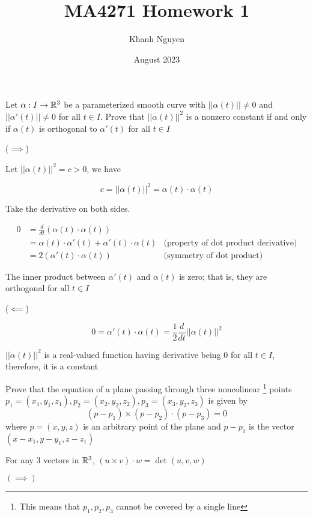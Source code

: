 \documentclass{article}
\title{
    MA4271 Homework 1
}
\author{Khanh Nguyen}
\date{August 2023}
\begin{document}
\maketitle

\begin{problem}
    Let $\alpha: I \to \mathbb{R}^3$ be a parameterized smooth curve with $||\alpha(t)|| \neq 0$ and $||\alpha'(t)|| \neq 0$ for all $t \in I$. Prove that $||\alpha(t)||^2$ is a nonzero constant if and only if $\alpha(t)$ is orthogonal to $\alpha'(t)$ for all $t \in I$
\end{problem}

($\implies$) 

Let $||\alpha(t)||^2 = c > 0$, we have

$$
    c = ||\alpha(t)||^2 = \alpha(t) \cdot \alpha(t)
$$

Take the derivative on both sides.

\begin{align*}
    0   &= \frac{d}{dt} ( \alpha(t) \cdot \alpha(t) )\\
        &= \alpha(t) \cdot \alpha'(t) + \alpha'(t) \cdot \alpha(t) &\text{(property of dot product derivative)}\\
        &= 2 (\alpha'(t) \cdot \alpha(t)) &\text{(symmetry of dot product)}
\end{align*}


The inner product between $\alpha'(t)$ and $\alpha(t)$ is zero; that is, they are orthogonal for all $t \in I$

($\impliedby$)

$$
    0 = \alpha'(t) \cdot \alpha(t) = \frac{1}{2} \frac{d}{dt} ||\alpha(t)||^2
$$

$||\alpha(t)||^2$ is a real-valued function having derivative being $0$ for all $t \in I$, therefore, it is a constant


\begin{problem}
    Prove that the equation of a plane passing through three noncolinear \footnote{This means that $p_1, p_2, p_3$ cannot be covered by a single line} points $p_1 = (x_1, y_1, z_1), p_2 = (x_2, y_2, z_2), p_3 = (x_3, y_3, z_3)$ is given by
    $$
        (p - p_1) \times (p - p_2) \cdot (p - p_3) = 0
    $$
    where $p = (x, y, z)$ is an arbitrary point of the plane and $p - p_1$ is the vector $(x - x_1, y - y_1, z - z_1)$
\end{problem}

For any $3$ vectors in $\mathbb{R}^3$, $(u \times v) \cdot w = \det(u, v, w)$

$(\implies)$
\end{document}

